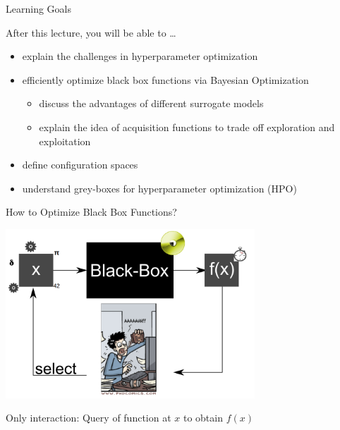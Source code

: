 \begin{frame}[c]{Learning Goals}

After this lecture, you will be able to \ldots

\begin{itemize}
  \item explain the \alert{challenges in hyperparameter optimization}
  \item efficiently optimize black box functions via \alert{Bayesian Optimization}
  \begin{itemize}
    \item discuss the advantages of different \alert{surrogate models}
    \item explain the idea of \alert{acquisition functions} to trade off exploration and exploitation
  \end{itemize}
  \item define \alert{configuration spaces}
  \item understand \alert{grey-boxes} for hyperparameter optimization (HPO)
\end{itemize}


\end{frame}
\begin{frame}[c]{How to Optimize Black Box Functions?}

\centering
\includegraphics[width=0.7\textwidth]{images/black_box_manual_opt.png}

Only interaction: Query of function at $x$ to obtain $f(x)$

\end{frame}
